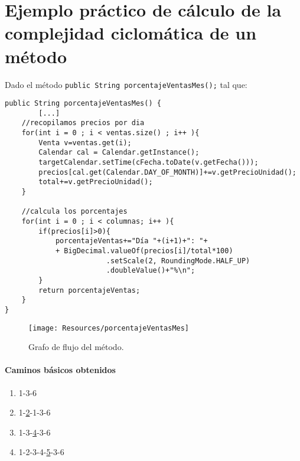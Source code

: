 \newpage
\section{Ejemplo práctico de cálculo de la complejidad ciclomática de un método}
Dado el método  \texttt{public String porcentajeVentasMes();} tal que:
\begin{verbatim}
public String porcentajeVentasMes() {
	    [...]
	//recopilamos precios por dia
    for(int i = 0 ; i < ventas.size() ; i++ ){
        Venta v=ventas.get(i);
        Calendar cal = Calendar.getInstance();
        targetCalendar.setTime(cFecha.toDate(v.getFecha()));
        precios[cal.get(Calendar.DAY_OF_MONTH)]+=v.getPrecioUnidad();
        total+=v.getPrecioUnidad();
    }

    //calcula los porcentajes
    for(int i = 0 ; i < columnas; i++ ){
        if(precios[i]>0){
        	porcentajeVentas+="Día "+(i+1)+": "+
        	+ BigDecimal.valueOf(precios[i]/total*100)
        		        .setScale(2, RoundingMode.HALF_UP)
        		        .doubleValue()+"%\n";
        }
        return porcentajeVentas;
    }
}   
\end{verbatim}

\begin{figure}[H]
    \centering
    \texttt{[image: Resources/porcentajeVentasMes]}
    \caption{Grafo de flujo del método.}
    \label{fig:joder}
\end{figure}
\newpage
\paragraph{Caminos básicos obtenidos}
\begin{enumerate}
    \item 1-3-6
    \item 1-\underline{2}-1-3-6
    \item 1-3-\underline{4}-3-6
    \item 1-2-3-4-\underline{5}-3-6
\end{enumerate}

